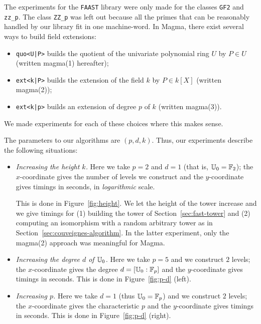The experiments for the \texttt{FAAST} library were only made for the
classes \texttt{GF2} and \texttt{zz\_p}. The class \texttt{ZZ\_p} was
left out because all the primes that can be reasonably handled by our
library fit in one machine-word. In Magma, there exist several ways to
build field extensions:
\begin{itemize}
\item \texttt{quo<U|P>} builds the quotient of the univariate
  polynomial ring $U$ by $P \in U$ (written magma(1) hereafter);
\item \texttt{ext<k|P>} builds the extension of the field $k$ by $P
  \in k[X]$ (written magma(2));
\item \texttt{ext<k|p>} builds an extension of degree $p$ of $k$
  (written magma(3)).
\end{itemize}
We made experiments for each of these choices where this makes sense.

The parameters to our algorithms are $(p,d,k)$. Thus, our experiments
describe the following situations:

\begin{itemize}
\item \emph{Increasing the height $k$.} Here we take $p=2$ and $d=1$
  (that is, $\mathbb{U}_0=\mathbb{F}_2$); the $x$-coordinate gives the number of
  levels we construct and the $y$-coordinate gives timings in seconds,
  in \emph{logarithmic} scale.

  This is done in Figure~\ref{fig:height}. We let the height of the
  tower increase and we give timings for (1) building the tower of
  Section~\ref{sec:fast-tower} and (2) computing an isomorphism with a
  random arbitrary tower as in Section~\ref{sec:couveignes-algorithm}.
  In the latter experiment, only the magma(2) approach was meaningful
  for Magma.
\item \emph{Increasing the degree $d$ of $\mathbb{U}_0$.} Here we take $p=5$
  and we construct $2$ levels; the $x$-coordinate gives the degree $d
  = [\mathbb{U}_0:\mathbb{F}_p]$ and the $y$-coordinate gives timings in seconds.
  This is done in Figure~\ref{fig:p-d} (left).
\item \emph{Increasing $p$.} Here we take $d=1$ (thus $\mathbb{U}_0=\mathbb{F}_p$) and
  we construct $2$ levels; the $x$-coordinate gives the characteristic
  $p$ and the $y$-coordinate gives timings in seconds.  This is done
  in Figure~\ref{fig:p-d} (right).
\end{itemize}




